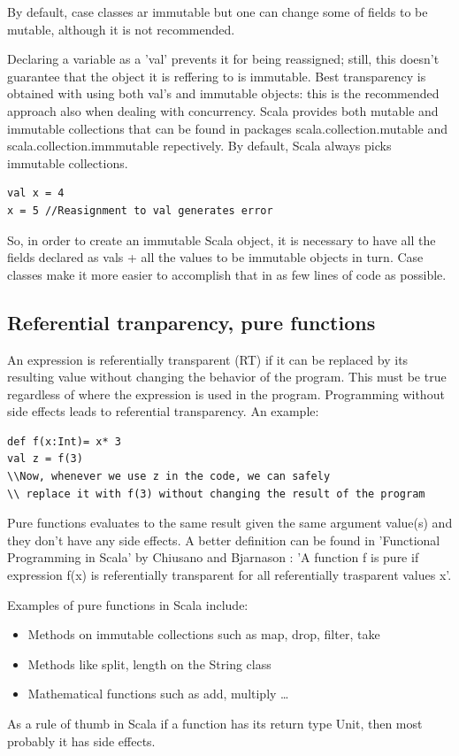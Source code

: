 \documentclass{article}
\begin{document}
By default, case classes ar immutable but one can change some of fields to be mutable, although it is not recommended.\par

Declaring a variable as a 'val' prevents it for being reassigned; still, this doesn't guarantee that the object it is reffering to is immutable. Best transparency is obtained with using both val's and immutable objects: this is the recommended approach also when dealing with concurrency. Scala provides both mutable and immutable collections that can be found in packages scala.collection.mutable and scala.collection.immmutable repectively. By default, Scala always picks immutable collections. 

\begin{lstlisting} 
val x = 4
x = 5 //Reasignment to val generates error
\end{lstlisting}


So, in order to create an immutable Scala object, it is necessary to have all the fields declared as vals + all the values to be immutable objects in turn. Case classes make it more easier to accomplish that in as few lines of code as possible.

\subsection {Referential tranparency, pure functions}
An expression is referentially transparent (RT) if it can be replaced by its resulting value without changing the behavior of the program. This must be true regardless of where the expression is used in the program. Programming without side effects leads to referential transparency. An example:

\begin{lstlisting}
def f(x:Int)= x* 3
val z = f(3)
\\Now, whenever we use z in the code, we can safely
\\ replace it with f(3) without changing the result of the program
\end{lstlisting}

Pure functions evaluates to the same result given the same argument value(s) and they don't have any side effects. A better definition can be found in 'Functional Programming in Scala' by Chiusano and Bjarnason : 'A function f is pure if expression f(x) is referentially transparent for all referentially trasparent values x'.\par
Examples of pure functions in Scala include:
\begin{itemize}

 \item Methods on immutable collections such as map, drop, filter, take
 \item Methods like split, length on the String class
 \item Mathematical functions such as add, multiply \ldots
\end{itemize}
As a rule of thumb in Scala if a function has its return type Unit, then most probably it has side effects. 
\end{document}
